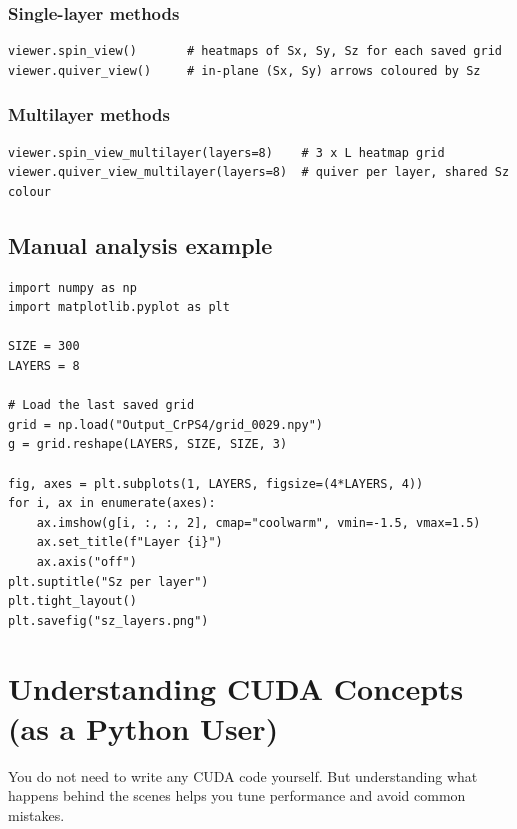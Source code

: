 \documentclass[12pt,a4paper]{article}
\begin{document}
\subsubsection{Single-layer methods}

\begin{lstlisting}[style=python]
viewer.spin_view()       # heatmaps of Sx, Sy, Sz for each saved grid
viewer.quiver_view()     # in-plane (Sx, Sy) arrows coloured by Sz
\end{lstlisting}

\subsubsection{Multilayer methods}

\begin{lstlisting}[style=python]
viewer.spin_view_multilayer(layers=8)    # 3 x L heatmap grid
viewer.quiver_view_multilayer(layers=8)  # quiver per layer, shared Sz colour
\end{lstlisting}

\subsection{Manual analysis example}

\begin{lstlisting}[style=python]
import numpy as np
import matplotlib.pyplot as plt

SIZE = 300
LAYERS = 8

# Load the last saved grid
grid = np.load("Output_CrPS4/grid_0029.npy")
g = grid.reshape(LAYERS, SIZE, SIZE, 3)

fig, axes = plt.subplots(1, LAYERS, figsize=(4*LAYERS, 4))
for i, ax in enumerate(axes):
    ax.imshow(g[i, :, :, 2], cmap="coolwarm", vmin=-1.5, vmax=1.5)
    ax.set_title(f"Layer {i}")
    ax.axis("off")
plt.suptitle("Sz per layer")
plt.tight_layout()
plt.savefig("sz_layers.png")
\end{lstlisting}

\section{Understanding CUDA Concepts (as a Python User)}
\label{sec:cuda}

You do not need to write any CUDA code yourself. But understanding what happens
behind the scenes helps you tune performance and avoid common mistakes.
\end{document}
